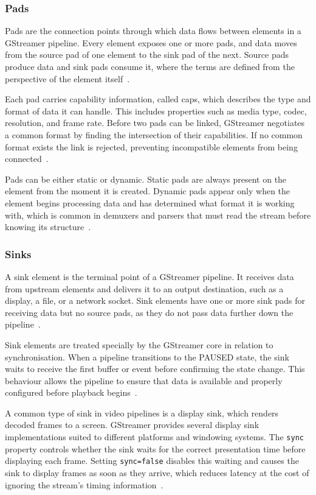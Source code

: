  
\subsubsection{Pads}\label{subsec:pads}
Pads are the connection points through which data flows between elements in a GStreamer pipeline. Every element exposes one or more pads, and data moves from the source pad of one element to the sink pad of the next. Source pads produce data and sink pads consume it, where the terms are defined from the perspective of the element itself~\cite{gstreamer_pads}.
 
Each pad carries capability information, called caps, which describes the type and format of data it can handle. This includes properties such as media type, codec, resolution, and frame rate. Before two pads can be linked, GStreamer negotiates a common format by finding the intersection of their capabilities. If no common format exists the link is rejected, preventing incompatible elements from being connected~\cite{gstreamer_pads}.
 
Pads can be either static or dynamic. Static pads are always present on the element from the moment it is created. Dynamic pads appear only when the element begins processing data and has determined what format it is working with, which is common in demuxers and parsers that must read the stream before knowing its structure~\cite{gstreamer_pads}.

 
\subsubsection{Sinks}\label{subsec:sinks}
A sink element is the terminal point of a GStreamer pipeline. It receives data from upstream elements and delivers it to an output destination, such as a display, a file, or a network socket. Sink elements have one or more sink pads for receiving data but no source pads, as they do not pass data further down the pipeline~\cite{gstreamer_sink}.
 
Sink elements are treated specially by the GStreamer core in relation to synchronisation. When a pipeline transitions to the PAUSED state, the sink waits to receive the first buffer or event before confirming the state change. This behaviour allows the pipeline to ensure that data is available and properly configured before playback begins~\cite{gstreamer_sink}.
 
A common type of sink in video pipelines is a display sink, which renders decoded frames to a screen. GStreamer provides several display sink implementations suited to different platforms and windowing systems. The \texttt{sync} property controls whether the sink waits for the correct presentation time before displaying each frame. Setting \texttt{sync=false} disables this waiting and causes the sink to display frames as soon as they arrive, which reduces latency at the cost of ignoring the stream's timing information~\cite{gstreamer_sink}.

